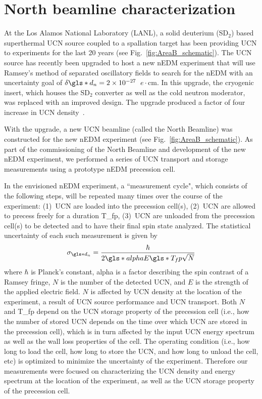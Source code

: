 
\chapter{North beamline characterization}
\label{chap:north_beamline_paper}


At the Los Alamos National Laboratory (LANL), a solid deuterium (SD$_2$) based superthermal UCN source coupled to a spallation target has been providing UCN to experiments for the last 20 years (see Fig.~\ref{fig:AreaB_schematic}). The UCN source has recently been upgraded to host a new nEDM experiment that will use Ramsey's method of separated oscillatory fields \cite{ramsey_molecular_1950} to search for the nEDM with an uncertainty goal of $\delta \gls*{d_n} = 2\times 10^{-27}$~$e\cdot\text{cm}$. In this upgrade, the cryogenic insert, which houses the SD$_2$ converter as well as the cold neutron moderator, was replaced with an improved design. The upgrade produced a factor of four increase in UCN density~\cite{ito_performance_2018}.

With the upgrade, a new UCN beamline (called the North Beamline) was constructed for the new nEDM experiment (see Fig.~\ref{fig:AreaB_schematic}). As part of the commissioning of the North Beamline and development of the new nEDM experiment, we performed a series of UCN transport and storage measurements using a prototype nEDM precession cell. 

In the envisioned nEDM experiment, a ``measurement cycle", which consists of the following steps, will be repeated many times over the course of the experiment: (1)~UCN are loaded into the precession cell(s), (2)~UCN are allowed to precess freely for a duration \gls*{T_fp}, (3)~UCN are unloaded from the precession cell(s) to be detected and to have their final spin state analyzed. The statistical uncertainty of each such measurement is given by 
%
\begin{gather}
    \sigma_{\gls*{d_n}} = \frac{\hbar}{2\gls*{alpha} E \gls*{T_fp} \sqrt{N}}
\end{gather}
%
where $\hbar$ is Planck’s constant, \gls*{alpha} is a factor describing the spin contrast of a Ramsey fringe, $N$ is the number of the detected UCN, and $E$ is the strength of the applied electric field. $N$ is affected by UCN density at the location of the experiment, a result of UCN source performance and UCN transport. Both $N$ and \gls*{T_fp} depend on the UCN storage property of the precession cell (i.e., how the number of stored UCN depends on the time over which UCN are stored in the precession cell), which is in turn affected by the input UCN energy spectrum as well as the wall loss properties of the cell. The operating condition (i.e., how long to load the cell, how long to store the UCN, and how long to unload the cell, etc) is optimized to minimize the uncertainty of the experiment. Therefore our measurements were focused on characterizing the UCN density and energy spectrum at the location of the experiment, as well as the UCN storage property of the precession cell. 

